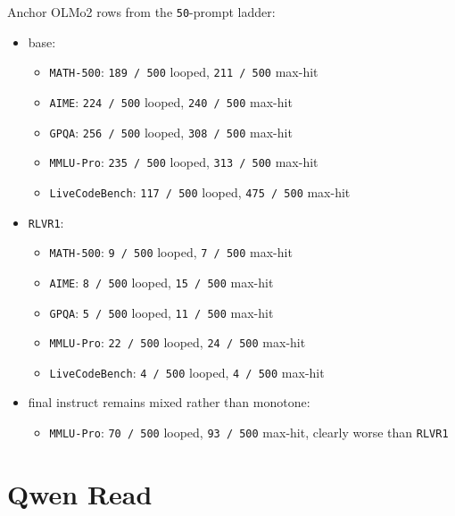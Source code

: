 \documentclass[11pt]{article}
\begin{document}
Anchor OLMo2 rows from the \texttt{50}-prompt ladder:
\begin{itemize}[leftmargin=1.5em]
\item base:
\begin{itemize}[leftmargin=1.5em]
\item \texttt{MATH-500}: \texttt{189 / 500} looped, \texttt{211 / 500} max-hit
\item \texttt{AIME}: \texttt{224 / 500} looped, \texttt{240 / 500} max-hit
\item \texttt{GPQA}: \texttt{256 / 500} looped, \texttt{308 / 500} max-hit
\item \texttt{MMLU-Pro}: \texttt{235 / 500} looped, \texttt{313 / 500} max-hit
\item \texttt{LiveCodeBench}: \texttt{117 / 500} looped, \texttt{475 / 500} max-hit
\end{itemize}
\item \texttt{RLVR1}:
\begin{itemize}[leftmargin=1.5em]
\item \texttt{MATH-500}: \texttt{9 / 500} looped, \texttt{7 / 500} max-hit
\item \texttt{AIME}: \texttt{8 / 500} looped, \texttt{15 / 500} max-hit
\item \texttt{GPQA}: \texttt{5 / 500} looped, \texttt{11 / 500} max-hit
\item \texttt{MMLU-Pro}: \texttt{22 / 500} looped, \texttt{24 / 500} max-hit
\item \texttt{LiveCodeBench}: \texttt{4 / 500} looped, \texttt{4 / 500} max-hit
\end{itemize}
\item final instruct remains mixed rather than monotone:
\begin{itemize}[leftmargin=1.5em]
\item \texttt{MMLU-Pro}: \texttt{70 / 500} looped, \texttt{93 / 500} max-hit, clearly worse than \texttt{RLVR1}
\end{itemize}
\end{itemize}

\section*{Qwen Read}
\begin{center}
\small
\setlength{\tabcolsep}{5pt}
\end{center}
\end{document}
